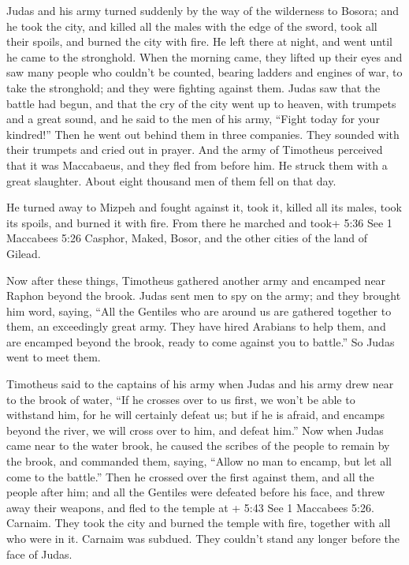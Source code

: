  Judas and his army turned suddenly by the way of the
wilderness to Bosora; and he took the city, and killed all the males
with the edge of the sword, took all their spoils, and burned the city
with fire.  He left there at night, and went until he came
to the stronghold.  When the morning came, they lifted up
their eyes and saw many people who couldn't be counted, bearing ladders
and engines of war, to take the stronghold; and they were fighting
against them.  Judas saw that the battle had begun, and
that the cry of the city went up to heaven, with trumpets and a great
sound,  and he said to the men of his army, ``Fight today
for your kindred!''  Then he went out behind them in three
companies. They sounded with their trumpets and cried out in prayer.
 And the army of Timotheus perceived that it was
Maccabaeus, and they fled from before him. He struck them with a great
slaughter. About eight thousand men of them fell on that day.

 He turned away to Mizpeh and fought against it, took it,
killed all its males, took its spoils, and burned it with fire.
 From there he marched and took+ 5:36 See 1 Maccabees 5:26
Casphor, Maked, Bosor, and the other cities of the land of Gilead.

 Now after these things, Timotheus gathered another army
and encamped near Raphon beyond the brook.  Judas sent men
to spy on the army; and they brought him word, saying, ``All the
Gentiles who are around us are gathered together to them, an exceedingly
great army.  They have hired Arabians to help them, and are
encamped beyond the brook, ready to come against you to battle.'' So
Judas went to meet them.

 Timotheus said to the captains of his army when Judas and
his army drew near to the brook of water, ``If he crosses over to us
first, we won't be able to withstand him, for he will certainly defeat
us;  but if he is afraid, and encamps beyond the river, we
will cross over to him, and defeat him.''  Now when Judas
came near to the water brook, he caused the scribes of the people to
remain by the brook, and commanded them, saying, ``Allow no man to
encamp, but let all come to the battle.''  Then he crossed
over the first against them, and all the people after him; and all the
Gentiles were defeated before his face, and threw away their weapons,
and fled to the temple at + 5:43 See 1 Maccabees 5:26. Carnaim.
 They took the city and burned the temple with fire,
together with all who were in it. Carnaim was subdued. They couldn't
stand any longer before the face of Judas.

